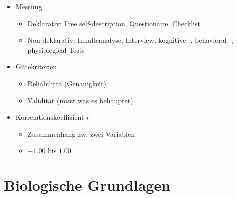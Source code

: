 \documentclass[11pt, paper=a4, twocolumn]{scrartcl}
\begin{document}
\begin{itemize}
		\item Messung
			\begin{itemize}
				\item Deklarativ: Free self-description, Questionaire, 
					Checklist
				\item Non-deklarativ: Inhaltsanalyse, Interview, 
					kognitive- , behavioral- , physiological Tests
			\end{itemize}
		\item Gütekriterien
			\begin{itemize}
				\item Reliabilität (Genauigkeit)
				\item Validität (misst was es behauptet)
			\end{itemize}
		\item Korrelationskoeffizient $r$
			\begin{itemize}
				\item Zusammenhang zw. zwei Variablen
				\item $-1.00$ bis $1.00$
			\end{itemize}
	\end{itemize}

	\section{Biologische Grundlagen}
\end{document}
